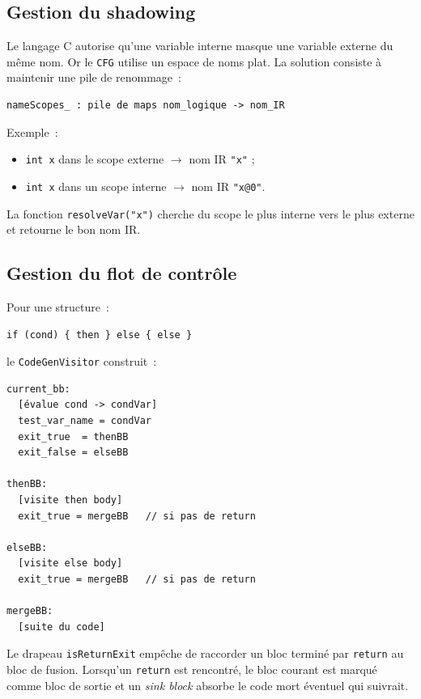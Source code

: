 \documentclass[11pt,a4paper]{article}
\begin{document}
\subsection{Gestion du shadowing}

Le langage C autorise qu'une variable interne masque une variable externe du même nom. Or le \texttt{CFG} utilise un espace de noms plat. La solution consiste à maintenir une pile de renommage~:

\begin{lstlisting}
nameScopes_ : pile de maps nom_logique -> nom_IR
\end{lstlisting}

Exemple~:
\begin{itemize}
  \item \texttt{int x} dans le scope externe $\rightarrow$ nom IR \texttt{"x"} ;
  \item \texttt{int x} dans un scope interne $\rightarrow$ nom IR \texttt{"x@0"}.
\end{itemize}

La fonction \texttt{resolveVar("x")} cherche du scope le plus interne vers le plus externe et retourne le bon nom IR.

\subsection{Gestion du flot de contrôle}

Pour une structure~:

\begin{lstlisting}
if (cond) { then } else { else }
\end{lstlisting}

le \texttt{CodeGenVisitor} construit~:

\begin{lstlisting}
current_bb:
  [évalue cond -> condVar]
  test_var_name = condVar
  exit_true  = thenBB
  exit_false = elseBB

thenBB:
  [visite then body]
  exit_true = mergeBB   // si pas de return

elseBB:
  [visite else body]
  exit_true = mergeBB   // si pas de return

mergeBB:
  [suite du code]
\end{lstlisting}

Le drapeau \texttt{isReturnExit} empêche de raccorder un bloc terminé par \texttt{return} au bloc de fusion. Lorsqu'un \texttt{return} est rencontré, le bloc courant est marqué comme bloc de sortie et un \emph{sink block} absorbe le code mort éventuel qui suivrait.
\end{document}
